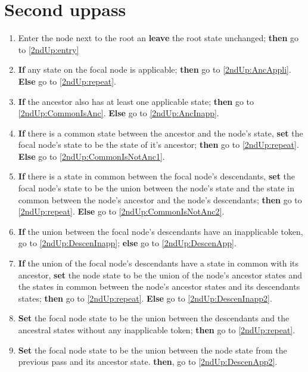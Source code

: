 \documentclass[a4paper,12pt]{article}
\begin{document}
\section{Second uppass} \label{2ndUp}

\begin{enumerate}
    \item Enter the node next to the root an \textbf{leave} the root state unchanged; \textbf{then} go to \ref{2ndUp:entry}
    \item \label{2ndUp:entry} \textbf{If} any state on the focal node is applicable; \textbf{then} go to \ref{2ndUp:AncAppli}. \textbf{Else} go to \ref{2ndUp:repeat}.
    \item \label{2ndUp:AncAppli} \textbf{If} the ancestor also has at least one applicable state; \textbf{then} go to \ref{2ndUp:CommonIsAnc}. \textbf{Else} go to \ref{2ndUp:AncInapp}.
    \item \label{2ndUp:CommonIsAnc} \textbf{If} there is a common state between the ancestor and the node's state, \textbf{set} the focal node's state to be the state of it's ancestor; \textbf{then} go to \ref{2ndUp:repeat}. \textbf{Else} go to \ref{2ndUp:CommonIsNotAnc1}.
    \item \label{2ndUp:CommonIsNotAnc1} \textbf{If} there is a state in common between the focal node's descendants, \textbf{set} the focal node's state to be the union between the node's state and the state in common between the node's ancestor and the node's descendants; \textbf{then} go to \ref{2ndUp:repeat}. \textbf{Else} go to \ref{2ndUp:CommonIsNotAnc2}.
    \item \label{2ndUp:CommonIsNotAnc2} \textbf{If} the union between the focal node's descendants have an inapplicable token, go to \ref{2ndUp:DescenInapp}; \textbf{else} go to \ref{2ndUp:DescenApp}.
    \item \label{2ndUp:DescenInapp} \textbf{If} the union of the focal node's descendants have a state in common with its ancestor, \textbf{set} the node state to be the union of the node's ancestor states and the states in common between the node's ancestor states and its descendants states; \textbf{then} go to \ref{2ndUp:repeat}. \textbf{Else} go to \ref{2ndUp:DescenInapp2}.
    \item \label{2ndUp:DescenInapp2} \textbf{Set} the focal node state to be the union between the descendants and the ancestral states without any inapplicable token; \textbf{then} go to \ref{2ndUp:repeat}.
    \item \label{2ndUp:DescenApp} \textbf{Set} the focal node state to be the union between the node state from the previous pass and its ancestor state. \textbf{then}, go to \ref{2ndUp:DescenApp2}.

\end{enumerate}
\end{document}
